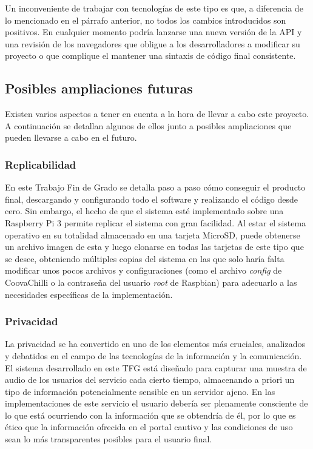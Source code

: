 Un inconveniente de trabajar con tecnologías de este tipo es que, a diferencia de lo mencionado en el párrafo anterior, no todos los cambios introducidos son positivos. En cualquier momento podría lanzarse una nueva versión de la API y una revisión de los navegadores que obligue a los desarrolladores a modificar su proyecto o que complique el mantener una sintaxis de código final consistente.

\subsection{Posibles ampliaciones futuras}

Existen varios aspectos a tener en cuenta a la hora de llevar a cabo este proyecto. A continuación se detallan algunos de ellos junto a posibles ampliaciones que pueden llevarse a cabo en el futuro.

\subsubsection{Replicabilidad}

En este Trabajo Fin de Grado se detalla paso a paso cómo conseguir el producto final, descargando y configurando todo el software y realizando el código desde cero. Sin embargo, el hecho de que el sistema esté implementado sobre una Raspberry Pi 3 permite replicar el sistema con gran facilidad. Al estar el sistema operativo en su totalidad almacenado en una tarjeta MicroSD, puede obtenerse un archivo imagen de esta y luego clonarse en todas las tarjetas de este tipo que se desee, obteniendo múltiples copias del sistema en las que solo haría falta modificar unos pocos archivos y configuraciones (como el archivo \emph{config} de CoovaChilli o la contraseña del usuario \emph{root} de Raspbian) para adecuarlo a las necesidades específicas de la implementación.

\subsubsection{Privacidad}

La privacidad se ha convertido en uno de los elementos más cruciales, analizados y debatidos en el campo de las tecnologías de la información y la comunicación. El sistema desarrollado en este TFG está diseñado para capturar una muestra de audio de los usuarios del servicio cada cierto tiempo, almacenando a priori un tipo de información potencialmente sensible en un servidor ajeno. En las implementaciones de este servicio el usuario debería ser plenamente consciente de lo que está ocurriendo con la información que se obtendría de él, por lo que es ético que la información ofrecida en el portal cautivo y las condiciones de uso sean lo más transparentes posibles para el usuario final.

